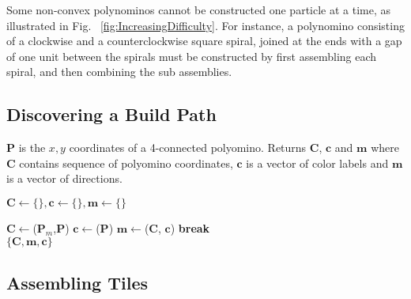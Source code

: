 Some non-convex polynominos cannot be constructed one particle at a time, as illustrated in Fig. ~\ref{fig:IncreasingDifficulty}.    For instance, a polynomino consisting of a clockwise and a counterclockwise square spiral, joined at the ends with a gap of one unit between the spirals must be constructed by first assembling each spiral, and then combining the sub assemblies.




\subsection{Discovering a Build Path}


\begin{algorithm}
\newcommand\algotext[3]{\end{algorithmic}#3\begin{algorithmic}[3]}
\caption{($\mathbf{P})$}
$\mathbf{P}$ is the $x,y$ coordinates of a 4-connected polyomino. 
Returns $ \mathbf{C} $, $ \mathbf{c} $ and $\mathbf{m}$ where $ \mathbf{C} $ contains sequence of polyomino coordinates, $ \mathbf{c} $ is a vector of color labels and $\mathbf{m}$ is a vector of directions.
\begin{algorithmic}[3]
\hbox{$\mathbf{C} \leftarrow \{\},\mathbf{c} \leftarrow \{\}, \mathbf{m} \leftarrow \{\}$}
 
\State$\mathbf{C}\leftarrow${}($\mathbf{P}_m$,$\mathbf{P}$)
\State$\mathbf{c}\leftarrow${}($\mathbf{P}$)
\State$ \mathbf{m}\leftarrow${}($\mathbf{C}$, $\mathbf{c}$)
\State \textbf{break}
\EndIf
\EndFor\\
\Return 
\State$\{ \mathbf{C}, \mathbf{m},\mathbf{c} \}$ 
\end{algorithmic}
\end{algorithm} 
  
\subsection{Assembling Tiles}


